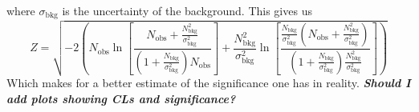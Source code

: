 \documentclass[14pt, a4paper]{book}
\begin{document}
where $\sigma_{\text{bkg}}$ is the uncertainty of the background. This gives us
\begin{equation}\label{eq:significance}
    Z = \sqrt{-2\left(N_{\text{obs}}\ln\left[\frac{N_{\text{obs}}+\frac{N_{\text{bkg}}^2}{\sigma_{\text{bkg}}^2} }{(1+\frac{N_{\text{bkg}}}{\sigma_{\text{bkg}}^2})N_{\text{obs}}}\right] + \frac{N_{\text{bkg}}^2}{\sigma_{\text{bkg}}^2} \ln\left[\frac{\frac{N_{\text{bkg}}}{\sigma_{\text{bkg}}^2}(N_{\text{obs}}+\frac{N_{\text{bkg}}^2}{\sigma_{\text{bkg}}^2} )}{(1+\frac{N_{\text{bkg}}}{\sigma_{\text{bkg}}^2})\frac{N_{\text{bkg}}^2}{\sigma_{\text{bkg}}^2}}\right]\right)}
\end{equation}
Which makes for a better estimate of the significance one has in reality. \textit{\textbf{Should I add plots showing CLs and significance?}}\\

\clearpage
\end{document}
